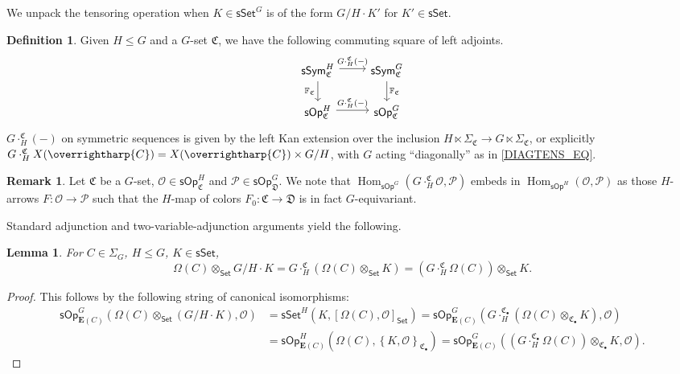 \documentclass[a4paper,10pt
,draft
]{article}%
\numberwithin{equation}{section}
\numberwithin{figure}{section}
\newtheorem{lemma}[equation]{Lemma}%
\theoremstyle{definition} %
\newtheorem{definition}[equation]{Definition}%
\newtheorem{remark}[equation]{Remark}%
\newcommand{\set}[1]{\left\{#1\right\}}%
\newcommand{\vect}[1]{\text{\overrightharp{\ensuremath{#1}}}}
\newcommand{\Set}{\ensuremath{\mathsf{Set}}}
\newcommand{\sSet}{\ensuremath{\mathsf{sSet}}}%
\newcommand{\sOp}{\ensuremath{\mathsf{sOp}}}%
\newcommand{\sSym}{\ensuremath{\mathsf{sSym}}}%
\DeclareMathOperator{\Hom}{Hom}%
\renewcommand{\O}{\ensuremath{\mathcal O}}
\renewcommand{\P}{\ensuremath{\mathcal P}}
\newcommand{\1}{\ensuremath{\mathbbm 1}}%
\begin{document}
We unpack the tensoring operation when $K \in \sSet^G$ is of the form $G/H \cdot K'$ for $K' \in \sSet$.
\begin{definition}
      Given $H \leq G$ and a $G$-set $\mathfrak C$, 
      we have the following commuting square of left adjoints.
      \[
            \begin{tikzcd}
                  \sSym^H_{\mathfrak C} \arrow[r, shift left, "G \cdot_H^{\mathfrak C} (-)"] \arrow[d, "\mathbb F_{\mathfrak C}"']
                  &
                  \sSym^G_{\mathfrak C} \arrow[d, "\mathbb F_{\mathfrak C}"]
                  \\
                  \sOp^H_{\mathfrak C} \arrow[r, shift left, "G \cdot_H^{\mathfrak C} (-)"]
                  &
                  \sOp^G_{\mathfrak C}
            \end{tikzcd}
      \]
      $G \cdot_H^{\mathfrak C} (-)$ on symmetric sequences is given by the left Kan extension over the inclusion
      $H \ltimes \Sigma_{\mathfrak C} \to G \ltimes \Sigma_{\mathfrak C}$,
      or explicitly
      $G \cdot_H^{\mathfrak C} X (\vect C) = X(\vect C) \times G/H$, with $G$ acting ``diagonally'' as in \eqref{DIAGTENS_EQ}.
\end{definition}

\begin{remark}
      Let $\mathfrak C$ be a $G$-set, 
      $\O \in \sOp^H_{\mathfrak C}$ and $\P \in \sOp^G_{\mathfrak D}$. 
      We note that $\Hom_{\sOp^G}(G \cdot_H^{\mathfrak C}\O, \P)$ embeds in $\Hom_{\sOp^H}(\O,\P)$
      as those $H$-arrows $F \colon \O \to \P$ such that the $H$-map of colors $F_0 \colon \mathfrak C \to \mathfrak D$
      is in fact $G$-equivariant.
\end{remark}

Standard adjunction and two-variable-adjunction arguments yield the following.
\begin{lemma}
      For $C \in \Sigma_G$, $H \leq G$, $K \in \sSet$,
      \begin{equation}
            \label{GHTENS_EQ}
            \Omega(C) \otimes_{\Set}G/H \cdot K = G \cdot_H^{\mathfrak C}\left( \Omega(C) \otimes_\Set K\right)
            = \left( G \cdot_H^{\mathfrak C} \Omega(C) \right) \otimes_\Set K.
      \end{equation}
\end{lemma}
{\color{OliveGreen} %
  \begin{proof}
        This follows by the following string of canonical isomorphisms:
        \begin{align*}
          \sOp_{\boldsymbol{E}(C)}^G (\Omega(C) \otimes_{\Set}(G/H \cdot K), \O) %
          & = \sSet^H(K, {[\Omega(C), \O]}_\Set) %
            = \sOp_{\boldsymbol{E}(C)}^G \left(G \cdot_H^{\mathfrak C_\bullet} \left( \Omega(C) \otimes_{\mathfrak C_\bullet} K \right), \O \right)         \\ %
          & = \sOp_{\boldsymbol{E}(C)}^H \left( \Omega(C), \set{K, \O}_{\mathfrak C_\bullet} \right)
            = \sOp_{\boldsymbol{E}(C)}^G \left( (G \cdot_H^{\mathfrak C_{\bullet}} \Omega(C)) \otimes_{\mathfrak C_\bullet} K, \O \right). %
        \end{align*}
  \end{proof}
} %
\end{document}
